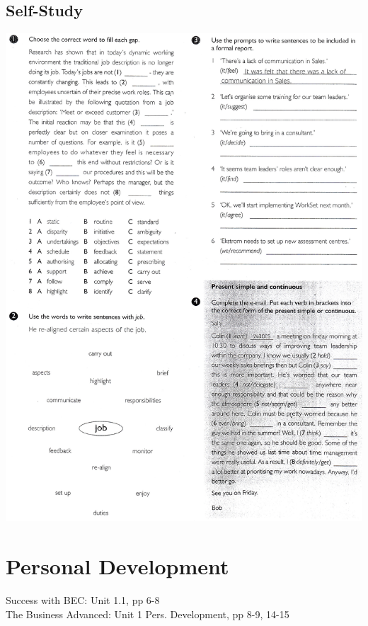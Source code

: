 \subsection{Self-Study}
\includegraphics[scale=.85]{handouts/Eng209.jpg}


\section{Personal Development}
Success with BEC: Unit 1.1, pp 6-8\\
The Business Advanced: Unit 1 Pers. Development, pp 8-9, 14-15
